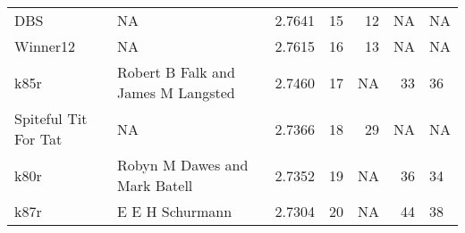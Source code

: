 \begin{tabular}{llrrrrl}
DBS                        &                                  NA &  2.7641 &    15 &            12 &             NA &              NA \\
Winner12                   &                                  NA &  2.7615 &    16 &            13 &             NA &              NA \\
k85r                       &  Robert B Falk and James M Langsted &  2.7460 &    17 &            NA &             33 &              36 \\
Spiteful Tit For Tat       &                                  NA &  2.7366 &    18 &            29 &             NA &              NA \\
k80r                       &       Robyn M Dawes and Mark Batell &  2.7352 &    19 &            NA &             36 &              34 \\
k87r                       &                     E E H Schurmann &  2.7304 &    20 &            NA &             44 &              38 \\
\bottomrule
\end{tabular}
